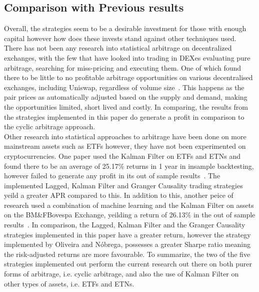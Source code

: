 \subsection{Comparison with Previous results}
Overall, the strategies seem to be a desirable investment for those with enough capital however how does these invests stand against other techniques used. There has not been any research into statistical arbitrage on decentralized exchanges, with the few that have looked into trading in DEXes evaluating pure arbitrage, searching for miss-pricing and executing them. One of which found there to be little to no profitable arbitrage opportunities on various decentralised exchanges, including Uniswap, regardless of volume size~\cite{boonpeam2021arbitrage}. This happens as the pair prices as automatically adjusted based on the supply and demand, making the opportunities limited, short lived and costly. In comparing, the results from the strategies implemented in this paper do generate a profit in comparison to the cyclic arbitrage approach.
\\[5mm]
Other research into statistical approaches to arbitrage have been done on more mainstream assets such as ETFs however, they have not been experimented on cryptocurrencies. One paper used the Kalman Filter on ETFs and ETNs and found there to be an average of 25.17\% returns in 1 year in insample backtesting, however failed to generate any profit in its out of sample results~\cite{dempsey_market_2017}. The implemented Lagged, Kalman Filter and Granger Causality trading strategies yeild a greater APR compared to this. In addition to this, another peice of research used a combination of machine learning and the Kalman Filter on assets on the BM\&FBovespa Exchange, yeilding a return of 26.13\% in the out of sample results~\cite{6974093}. In comparison, the Lagged, Kalman Filter and the Granger Causality strategies implemented in this paper have a greater return, however the strategy implemented by Oliveira and Nóbrega, possesses a greater Sharpe ratio meaning the risk-adjusted returns are more favourable. To summarize, the two of the five strategies implemented out perform the current research out there on both purer forms of arbitrage, i.e. cyclic arbitrage, and also the use of Kalman Filter on other types of assets, i.e. ETFs and ETNs.
